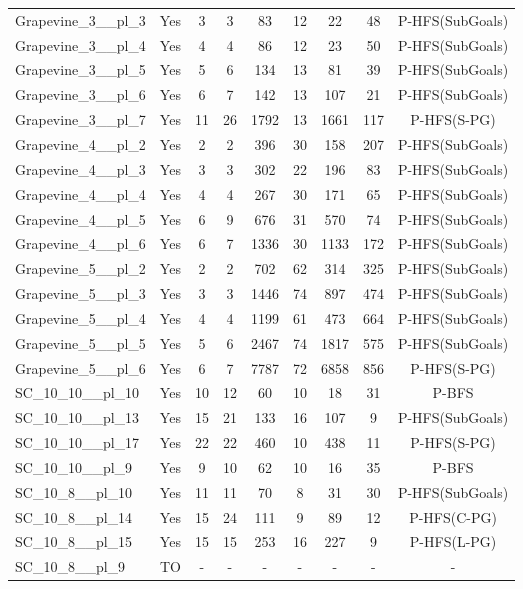 \documentclass{article}
\begin{document}
\begin{tabular}{lcccccccc}
Grapevine\_3\_\_pl\_3 & Yes & 3 & 3 & 83 & 12 & 22 & 48 & P-HFS(SubGoals) \\
Grapevine\_3\_\_pl\_4 & Yes & 4 & 4 & 86 & 12 & 23 & 50 & P-HFS(SubGoals) \\
Grapevine\_3\_\_pl\_5 & Yes & 5 & 6 & 134 & 13 & 81 & 39 & P-HFS(SubGoals) \\
Grapevine\_3\_\_pl\_6 & Yes & 6 & 7 & 142 & 13 & 107 & 21 & P-HFS(SubGoals) \\
Grapevine\_3\_\_pl\_7 & Yes & 11 & 26 & 1792 & 13 & 1661 & 117 & P-HFS(S-PG) \\
Grapevine\_4\_\_pl\_2 & Yes & 2 & 2 & 396 & 30 & 158 & 207 & P-HFS(SubGoals) \\
Grapevine\_4\_\_pl\_3 & Yes & 3 & 3 & 302 & 22 & 196 & 83 & P-HFS(SubGoals) \\
Grapevine\_4\_\_pl\_4 & Yes & 4 & 4 & 267 & 30 & 171 & 65 & P-HFS(SubGoals) \\
Grapevine\_4\_\_pl\_5 & Yes & 6 & 9 & 676 & 31 & 570 & 74 & P-HFS(SubGoals) \\
Grapevine\_4\_\_pl\_6 & Yes & 6 & 7 & 1336 & 30 & 1133 & 172 & P-HFS(SubGoals) \\
Grapevine\_5\_\_pl\_2 & Yes & 2 & 2 & 702 & 62 & 314 & 325 & P-HFS(SubGoals) \\
Grapevine\_5\_\_pl\_3 & Yes & 3 & 3 & 1446 & 74 & 897 & 474 & P-HFS(SubGoals) \\
Grapevine\_5\_\_pl\_4 & Yes & 4 & 4 & 1199 & 61 & 473 & 664 & P-HFS(SubGoals) \\
Grapevine\_5\_\_pl\_5 & Yes & 5 & 6 & 2467 & 74 & 1817 & 575 & P-HFS(SubGoals) \\
Grapevine\_5\_\_pl\_6 & Yes & 6 & 7 & 7787 & 72 & 6858 & 856 & P-HFS(S-PG) \\
SC\_10\_10\_\_pl\_10 & Yes & 10 & 12 & 60 & 10 & 18 & 31 & P-BFS \\
SC\_10\_10\_\_pl\_13 & Yes & 15 & 21 & 133 & 16 & 107 & 9 & P-HFS(SubGoals) \\
SC\_10\_10\_\_pl\_17 & Yes & 22 & 22 & 460 & 10 & 438 & 11 & P-HFS(S-PG) \\
SC\_10\_10\_\_pl\_9 & Yes & 9 & 10 & 62 & 10 & 16 & 35 & P-BFS \\
SC\_10\_8\_\_pl\_10 & Yes & 11 & 11 & 70 & 8 & 31 & 30 & P-HFS(SubGoals) \\
SC\_10\_8\_\_pl\_14 & Yes & 15 & 24 & 111 & 9 & 89 & 12 & P-HFS(C-PG) \\
SC\_10\_8\_\_pl\_15 & Yes & 15 & 15 & 253 & 16 & 227 & 9 & P-HFS(L-PG) \\
SC\_10\_8\_\_pl\_9 & TO & - & - & - & - & - & - & - \\

\end{tabular}
\end{document}
